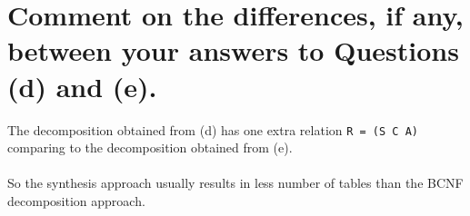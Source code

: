\documentclass{article}
\begin{document}
\section{Comment on the differences, if any, between your answers to Questions (d) and (e).}
The decomposition obtained from (d) has one extra relation \texttt{R = (S C A)} comparing to the decomposition obtained from (e).\\
\\
So the synthesis approach usually results in less number of tables than the BCNF decomposition approach.
\end{document}
